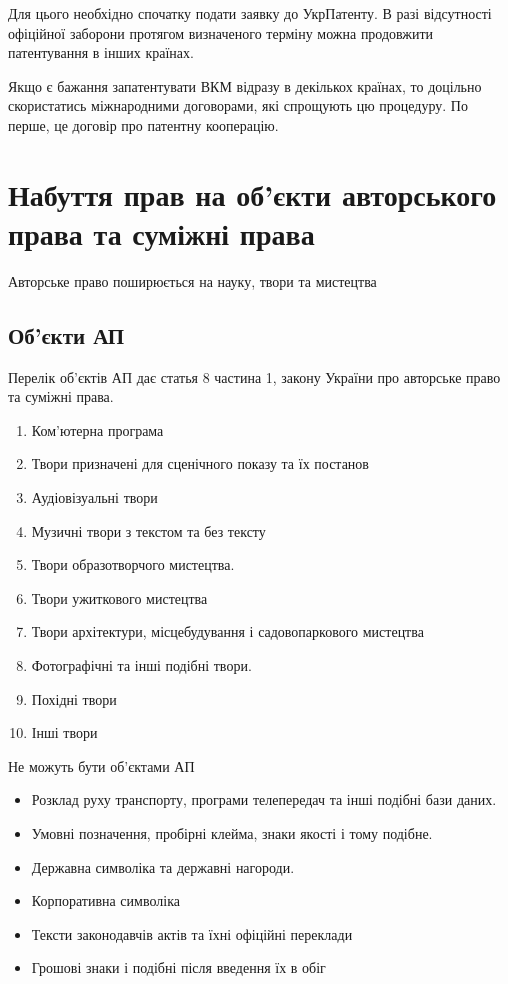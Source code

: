 Для цього необхідно спочатку подати заявку до УкрПатенту. В разі відсутності офіційної заборони протягом визначеного терміну можна продовжити патентування в інших країнах.

Якщо є бажання запатентувати ВКМ відразу в декількох країнах, то доцільно скористатись міжнародними договорами, які спрощують цю процедуру. По перше, це договір про патентну кооперацію.

\section{Набуття прав на об’єкти авторського права та суміжні права}
Авторське право поширюється на науку, твори та мистецтва
\subsection{Об’єкти АП}
Перелік об’єктів АП дає статья 8 частина 1, закону України про авторське право та суміжні права.

\begin{enumerate}
	\item Ком’ютерна програма
	\item Твори призначені для сценічного показу та їх постанов
	\item Аудіовізуальні твори
	\item Музичні твори з текстом та без тексту
	\item Твори образотворчого мистецтва.
	\item Твори ужиткового мистецтва
	\item Твори архітектури, місцебудування і садовопаркового мистецтва
	\item Фотографічні та інші подібні твори.
	\item Похідні твори
	\item Інші твори
\end{enumerate}

Не можуть бути об’єктами АП
\begin{itemize}
	\item Розклад руху транспорту, програми телепередач та інші подібні бази даних.
	\item Умовні позначення, пробірні клейма, знаки якості і тому подібне.
	\item Державна символіка та державні нагороди.
	\item Корпоративна символіка
	\item Тексти законодавчів актів та їхні офіційні переклади
	\item Грошові знаки і подібні після введення їх в обіг
\end{itemize}